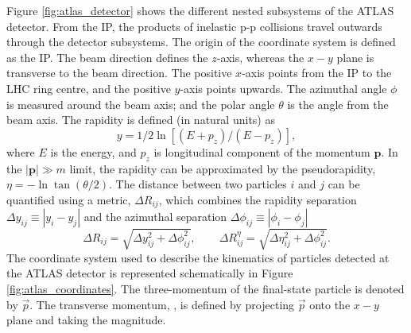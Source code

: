 Figure \ref{fig:atlas_detector} shows the different nested subsystems of the ATLAS detector. From the IP, the products of inelastic p-p collisions travel outwards through the detector subsystems. The origin of the coordinate system is defined as the IP. The beam direction defines the $z$-axis, whereas the $x-y$ plane is transverse to the beam direction. The positive $x$-axis points from the IP to the LHC ring centre, and the positive $y$-axis points upwards. The azimuthal angle $\phi$ is measured around the beam axis; and the polar angle $\theta$ is the angle from the beam axis. The rapidity is defined (in natural units) as
\begin{equation}
y = 1/2\ln [(E+p_z)/(E-p_z)], 
\end{equation}
where $E$ is the energy, and $p_z$ is longitudinal component of the momentum $\mathbf{p}$. In the $|\mathbf{p}|\gg m$ limit, the rapidity can be approximated by the pseudorapidity, $\eta=-\ln\tan (\theta/2)$. The distance between two particles $i$ and $j$ can be quantified using a metric, $\Delta R_{ij}$, which combines the rapidity separation $\Delta y_{ij}\equiv|y_i-y_j|$ and the azimuthal separation $\Delta \phi_{ij}\equiv|\phi_i-\phi_j|$
\begin{equation}
    \Delta R_{ij}=\sqrt{\Delta y_{ij}^2+\Delta\phi_{ij}^2},\hspace{25pt} \Delta R^{\eta}_{ij}=\sqrt{\Delta\eta_{ij}^2+\Delta\phi_{ij}^2}.
\end{equation}
The coordinate system used to describe the kinematics of particles detected at the ATLAS detector is represented schematically in Figure \ref{fig:atlas_coordinates}. The three-momentum of the final-state particle is denoted by $\vec{p}$. The transverse momentum, \pt, is defined by projecting $\vec{p}$ onto the $x-y$ plane and taking the magnitude. %
